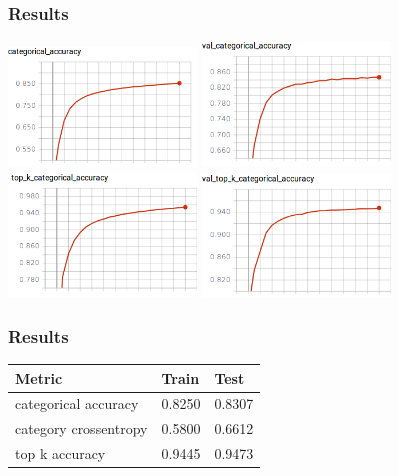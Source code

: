 \documentclass[14pt]{beamer}
\begin{document}
		\begin{frame}
		\frametitle{Results}
			\hfil\hfil\includegraphics[width=5cm]{part4/final_CNN_train_category_accuracy}
			\hfil\hfil\includegraphics[width=5cm]{part4/final_CNN_val_category_accuracy}\newline
			\vfil
			\hfil\hfil\includegraphics[width=5cm]{part4/final_CNN_train_top_k_accuracy}
			\hfil\hfil\includegraphics[width=5cm]{part4/final_CNN_val_top_k_accuracy}\newline
		\end{frame}
		
		
		\begin{frame}
			\frametitle{Results}
			\begin{table}[h]
				\centering
				\begin{tabular}{| p{4cm} | p{3cm} | p{3cm} |}
					\hline
					\textbf{Metric}  & \textbf{Train} & \textbf{Test}                                                    
					\\ \hline
					categorical accuracy   &  0.8250 & 0.8307
					\\ \hline
					category crossentropy  &   0.5800 & 0.6612
					\\ \hline
					top k accuracy   &  0.9445 & 0.9473
					\\ \hline		
				\end{tabular}
			\end{table}
		\end{frame}
		
\end{document}
